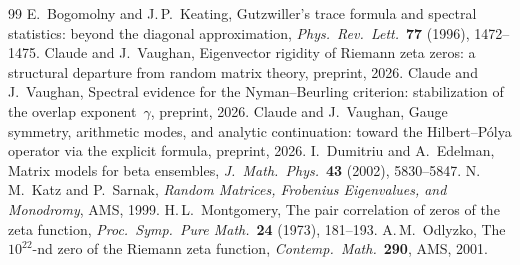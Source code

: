 \documentclass[11pt,a4paper]{article}
\begin{document}
\begin{thebibliography}{99}
 E.~Bogomolny and J.\,P.~Keating, Gutzwiller's trace formula and spectral statistics: beyond the diagonal approximation, \emph{Phys.\ Rev.\ Lett.}\ \textbf{77} (1996), 1472--1475.
 Claude and J.~Vaughan, Eigenvector rigidity of Riemann zeta zeros: a structural departure from random matrix theory, preprint, 2026.
 Claude and J.~Vaughan, Spectral evidence for the Nyman--Beurling criterion: stabilization of the overlap exponent~$\gamma$, preprint, 2026.
 Claude and J.~Vaughan, Gauge symmetry, arithmetic modes, and analytic continuation: toward the Hilbert--P\'olya operator via the explicit formula, preprint, 2026.
 I.~Dumitriu and A.~Edelman, Matrix models for beta ensembles, \emph{J.\ Math.\ Phys.}\ \textbf{43} (2002), 5830--5847.
 N.\,M.~Katz and P.~Sarnak, \emph{Random Matrices, Frobenius Eigenvalues, and Monodromy}, AMS, 1999.
 H.\,L.~Montgomery, The pair correlation of zeros of the zeta function, \emph{Proc.\ Symp.\ Pure Math.}\ \textbf{24} (1973), 181--193.
 A.\,M.~Odlyzko, The $10^{22}$-nd zero of the Riemann zeta function, \emph{Contemp.\ Math.}\ \textbf{290}, AMS, 2001.
\end{thebibliography}
\end{document}
